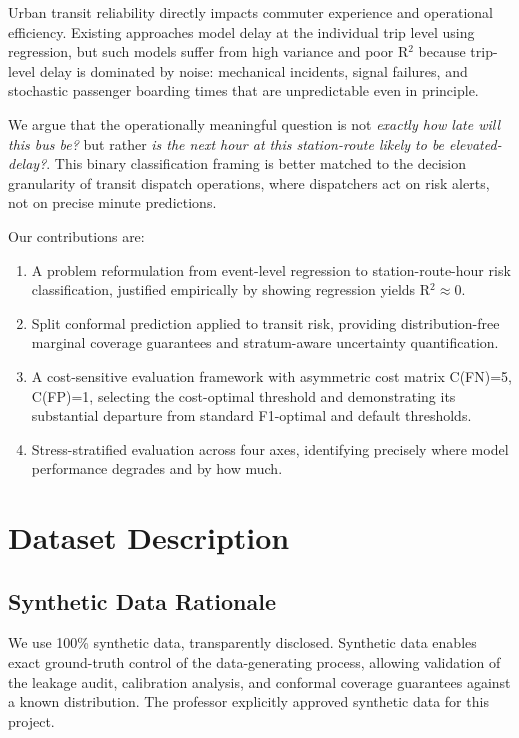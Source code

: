 \documentclass[conference]{IEEEtran}
\begin{document}
Urban transit reliability directly impacts commuter experience and operational efficiency.
Existing approaches model delay at the individual trip level using regression,
but such models suffer from high variance and poor R$^2$ because trip-level delay
is dominated by noise: mechanical incidents, signal failures, and stochastic passenger
boarding times that are unpredictable even in principle.

We argue that the operationally meaningful question is not \textit{exactly how late will
this bus be?} but rather \textit{is the next hour at this station-route likely to be
elevated-delay?}. This binary classification framing is better matched to the decision
granularity of transit dispatch operations, where dispatchers act on risk alerts, not
on precise minute predictions.

Our contributions are:
\begin{enumerate}
  \item A problem reformulation from event-level regression to station-route-hour risk
        classification, justified empirically by showing regression yields R$^2 \approx 0$.
  \item Split conformal prediction \cite{vovk2005algorithmic,angelopoulos2021gentle}
        applied to transit risk, providing distribution-free marginal coverage guarantees
        and stratum-aware uncertainty quantification.
  \item A cost-sensitive evaluation framework with asymmetric cost matrix
        C(FN)=5, C(FP)=1, selecting the cost-optimal threshold and demonstrating
        its substantial departure from standard F1-optimal and default thresholds.
  \item Stress-stratified evaluation across four axes, identifying precisely where
        model performance degrades and by how much.
\end{enumerate}

\section{Dataset Description}

\subsection{Synthetic Data Rationale}

We use 100\% synthetic data, transparently disclosed. Synthetic data enables exact
ground-truth control of the data-generating process, allowing validation of the leakage
audit, calibration analysis, and conformal coverage guarantees against a known distribution.
The professor explicitly approved synthetic data for this project.
\end{document}
